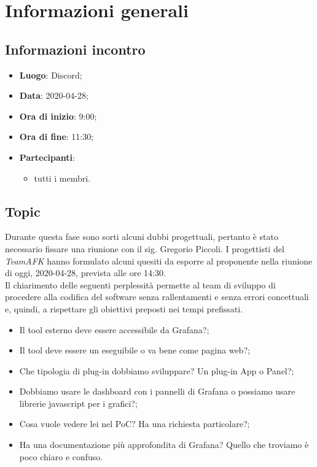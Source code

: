 \section{Informazioni generali}
\subsection{Informazioni incontro}
\begin{itemize}
\item \textbf{Luogo}: Discord;
\item \textbf{Data}: 2020-04-28;
\item \textbf{Ora di inizio}: 9:00;
\item \textbf{Ora di fine}: 11:30;
\item \textbf{Partecipanti}:
	\begin{itemize}
		\item tutti i membri.
	\end{itemize}
\end{itemize}

\subsection{Topic}
Durante questa fase sono sorti alcuni dubbi progettuali, pertanto è stato necessario fissare una riunione con il sig. Gregorio Piccoli.
I progettisti del \textit{TeamAFK} hanno formulato alcuni quesiti da esporre al proponente nella riunione di oggi, 2020-04-28, prevista alle ore 14:30.\\
Il chiarimento delle seguenti perplessità permette al team di sviluppo di procedere alla codifica del software senza rallentamenti e senza errori concettuali e, quindi, a rispettare gli obiettivi preposti nei tempi prefissati.
\begin{itemize}
\item Il tool esterno deve essere accessibile da Grafana?;
\item Il tool deve essere un eseguibile o va bene come pagina web?;
\item Che tipologia di plug-in dobbiamo sviluppare? Un plug-in App o Panel?;
\item Dobbiamo usare le dashboard con i pannelli di Grafana o possiamo usare librerie javascript per i grafici?;
\item Cosa vuole vedere lei nel PoC? Ha una richiesta particolare?;
\item Ha una documentazione più approfondita di Grafana? Quello che troviamo è poco chiaro e confuso.
\end{itemize}
